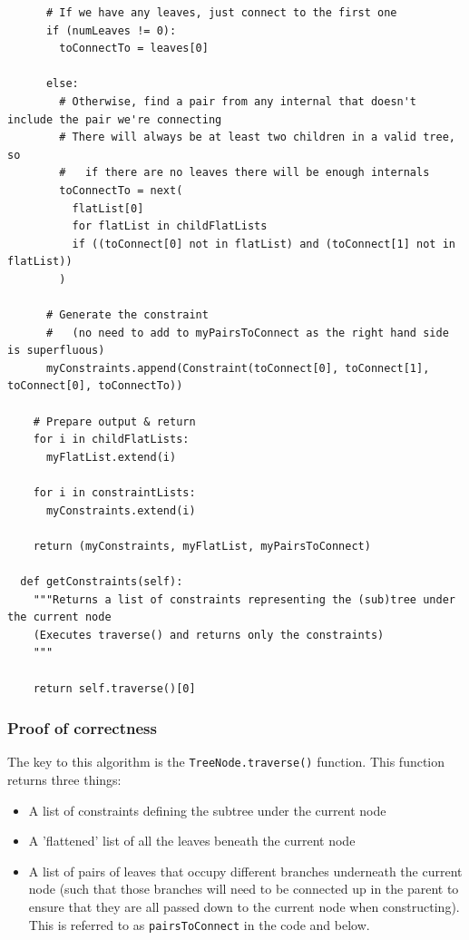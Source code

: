 \documentclass[11pt]{article} %
\begin{document}
\begin{landscape}
\begin{lstlisting}
      # If we have any leaves, just connect to the first one
      if (numLeaves != 0):
        toConnectTo = leaves[0]
      
      else:
        # Otherwise, find a pair from any internal that doesn't include the pair we're connecting
        # There will always be at least two children in a valid tree, so
        #   if there are no leaves there will be enough internals
        toConnectTo = next(
          flatList[0]
          for flatList in childFlatLists
          if ((toConnect[0] not in flatList) and (toConnect[1] not in flatList))
        )
      
      # Generate the constraint
      #   (no need to add to myPairsToConnect as the right hand side is superfluous)
      myConstraints.append(Constraint(toConnect[0], toConnect[1], toConnect[0], toConnectTo))
    
    # Prepare output & return
    for i in childFlatLists:
      myFlatList.extend(i)
    
    for i in constraintLists:
      myConstraints.extend(i)

    return (myConstraints, myFlatList, myPairsToConnect)
  
  def getConstraints(self):
    """Returns a list of constraints representing the (sub)tree under the current node
    (Executes traverse() and returns only the constraints)
    """

    return self.traverse()[0]
\end{lstlisting}
\end{landscape}

\subsubsection{Proof of correctness}
The key to this algorithm is the \texttt{TreeNode.traverse()} function. This function returns three things:
\begin{itemize}
	\item A list of constraints defining the subtree under the current node
	\item A 'flattened' list of all the leaves beneath the current node
	\item A list of pairs of leaves that occupy different branches underneath the current node (such that those branches will need to be connected up in the parent to ensure that they are all passed down to the current node when constructing). This is referred to as \texttt{pairsToConnect} in the code and below.
\end{itemize}
\end{document}
